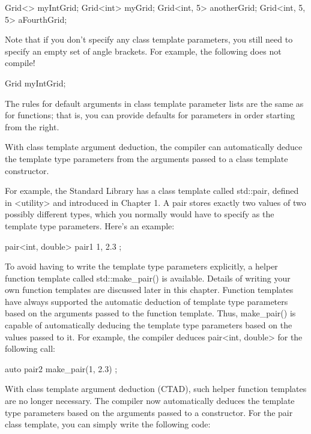 \begin{cpp}
Grid<> myIntGrid;
Grid<int> myGrid;
Grid<int, 5> anotherGrid;
Grid<int, 5, 5> aFourthGrid;
\end{cpp}

Note that if you don’t specify any class template parameters, you still need to specify an empty set of angle brackets. For example, the following does not compile!

\begin{cpp}
Grid myIntGrid;
\end{cpp}

The rules for default arguments in class template parameter lists are the same as for functions; that is, you can provide defaults for parameters in order starting from the right.


With class template argument deduction, the compiler can automatically deduce the template type parameters from the arguments passed to a class template constructor.

For example, the Standard Library has a class template called std::pair, defined in <utility> and introduced in Chapter 1. A pair stores exactly two values of two possibly different types, which you normally would have to specify as the template type parameters. Here’s an example:

\begin{cpp}
pair<int, double> pair1 { 1, 2.3 };
\end{cpp}

To avoid having to write the template type parameters explicitly, a helper function template called std::make\_pair() is available. Details of writing your own function templates are discussed later in this chapter. Function templates have always supported the automatic deduction of template type parameters based on the arguments passed to the function template. Thus, make\_pair() is capable of automatically deducing the template type parameters based on the values passed to it. For example, the compiler deduces pair<int, double> for the following call:

\begin{cpp}
auto pair2 { make_pair(1, 2.3) };
\end{cpp}

With class template argument deduction (CTAD), such helper function templates are no longer necessary. The compiler now automatically deduces the template type parameters based on the arguments passed to a constructor. For the pair class template, you can simply write the following code:


